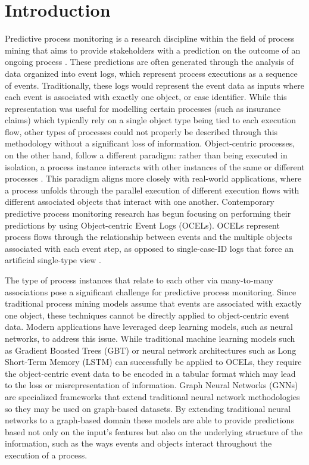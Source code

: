 
\chapter{Introduction}
\label{chp:intro}

Predictive process monitoring is a research discipline within the field of process mining that aims to provide stakeholders with a prediction on the outcome of an ongoing process \cite{vanderaalst2012}. These predictions are often generated through the analysis of data organized into event logs, which represent process executions as a sequence of events. Traditionally, these logs would represent the event data as inputs where each event is associated with exactly one object, or case identifier. While this representation was useful for modelling certain processes (such as insurance claims) which typically rely on a single object type being tied to each execution flow, other types of processes could not properly be described through this methodology without a significant loss of information. Object-centric processes, on the other hand, follow a different paradigm: rather than being executed in isolation, a process instance interacts with other instances of the same or different processes \cite{galanti2023a}. This paradigm aligns more closely with real-world applications, where a process unfolds through the parallel execution of different execution flows with different associated objects that interact with one another.
Contemporary predictive process monitoring research has begun focusing on performing their predictions by using Object-centric Event Logs (OCELs). OCELs represent process flows through the relationship between events and the multiple objects associated with each event step, as opposed to single-case-ID logs that force an artificial single-type view \cite{galanti2023a}. 

The type of process instances that relate to each other via many-to-many associations pose a significant challenge for predictive process monitoring. Since traditional process mining models assume that events are associated with exactly one object, these techniques cannot be directly applied to object-centric event data. Modern applications have leveraged deep learning models, such as neural networks, to address this issue. While traditional machine learning models such as Gradient Boosted Trees (GBT) or neural network architectures such as Long Short-Term Memory (LSTM) can successfully be applied to OCELs, they require the object-centric event data to be encoded in a tabular format which may lead to the loss or misrepresentation of information. Graph Neural Networks (GNNs) are specialized frameworks that extend traditional neural network methodologies so they may be used on graph-based datasets. By extending traditional neural networks to a graph-based domain these models are able to provide predictions based not only on the input's features but also on the underlying structure of the information, such as the ways events and objects interact throughout the execution of a process. 

